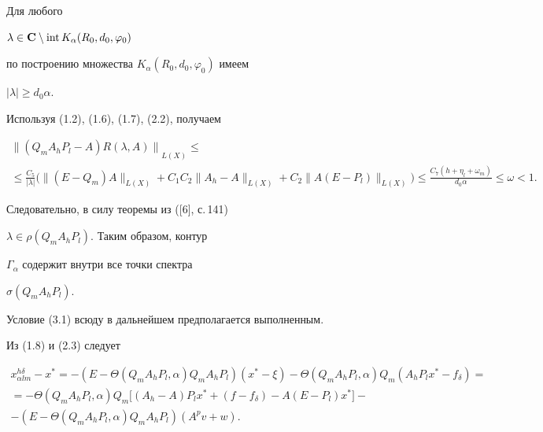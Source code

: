 \begin{pf}


Для любого


$\lambda \in {\bold C} \setminus \operatorname{int} K_{\alpha}(R_0, d_0, \varphi_0)$


по построению множества $K_{\alpha}(R_0, d_0, \varphi_0)$ имеем


$| \lambda | \geq d_0 \alpha$.


Используя (1.2), (1.6), (1.7), (2.2), получаем


\begin{multline}


{ \| (Q_m A_h P_l-A) R( \lambda, A) \|}_{L(X)} \leq \\


%


\leq \frac{C_5}{| \lambda |} \big( \| (E- Q_m) A \|_{L(X)}


+ C_1 C_2 \| A_h - A \|_{L(X)}


+ C_2 \| A (E-P_l) \|_{L(X)} \big) \leq


\frac{C_7( h + \eta_l + \omega_m)}{d_0 \alpha}\leq \omega <1.


\tag{3.2}


\end{multline}


Следовательно, в силу теоремы из ([6], с.\,141)


$ \lambda \in \rho (Q_m A_h P_l)$. Таким образом, контур


$\Gamma_{\alpha}$ содержит внутри все точки спектра


$\sigma (Q_m A_h P_l)$.


\end{pf}





Условие (3.1) всюду в дальнейшем предполагается выполненным.


Из (1.8) и (2.3) следует


\begin{multline}


x_{\alpha l m}^{h \delta}-x^{*}=


-(E-\Theta(Q_m A_h P_l,\alpha) Q_m A_h P_l)(x^{*}-\xi)-


\Theta(Q_m A_h P_l, \alpha) Q_m(A_h P_l x^{*}- f_{\delta})= \\


%


=-\Theta(Q_m A_h P_l, \alpha)Q_m \lbrack (A_h-A)P_l x^{*}+(f- f_{\delta})-


A(E-P_l)x^{*} \rbrack - \\


%


-(E-\Theta(Q_m A_h P_l,\alpha) Q_m A_h P_l)(A^p v+w).\tag{3.3}


\end{multline}


